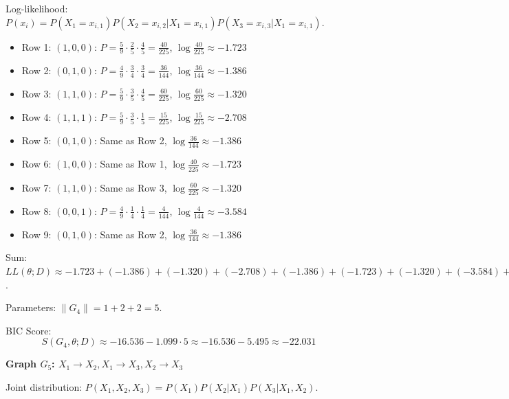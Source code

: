 \documentclass[a3paper,12pt]{extarticle} %
\begin{document}
Log-likelihood: \(P(x_i) = P(X_1 = x_{i,1}) P(X_2 = x_{i,2} | X_1 = x_{i,1}) P(X_3 = x_{i,3} | X_1 = x_{i,1})\).
\begin{itemize}
    \item Row 1: \((1,0,0)\): \(P = \frac{5}{9} \cdot \frac{2}{5} \cdot \frac{4}{5} = \frac{40}{225}\), \(\log \frac{40}{225} \approx -1.723\)
    \item Row 2: \((0,1,0)\): \(P = \frac{4}{9} \cdot \frac{3}{4} \cdot \frac{3}{4} = \frac{36}{144}\), \(\log \frac{36}{144} \approx -1.386\)
    \item Row 3: \((1,1,0)\): \(P = \frac{5}{9} \cdot \frac{3}{5} \cdot \frac{4}{5} = \frac{60}{225}\), \(\log \frac{60}{225} \approx -1.320\)
    \item Row 4: \((1,1,1)\): \(P = \frac{5}{9} \cdot \frac{3}{5} \cdot \frac{1}{5} = \frac{15}{225}\), \(\log \frac{15}{225} \approx -2.708\)
    \item Row 5: \((0,1,0)\): Same as Row 2, \(\log \frac{36}{144} \approx -1.386\)
    \item Row 6: \((1,0,0)\): Same as Row 1, \(\log \frac{40}{225} \approx -1.723\)
    \item Row 7: \((1,1,0)\): Same as Row 3, \(\log \frac{60}{225} \approx -1.320\)
    \item Row 8: \((0,0,1)\): \(P = \frac{4}{9} \cdot \frac{1}{4} \cdot \frac{1}{4} = \frac{4}{144}\), \(\log \frac{4}{144} \approx -3.584\)
    \item Row 9: \((0,1,0)\): Same as Row 2, \(\log \frac{36}{144} \approx -1.386\)
\end{itemize}
Sum: \(LL(\theta; D) \approx -1.723 + (-1.386) + (-1.320) + (-2.708) + (-1.386) + (-1.723) + (-1.320) + (-3.584) + (-1.386) \approx -16.536\).

Parameters: \(\|G_4\| = 1 + 2 + 2 = 5\).

BIC Score:
\[
S(G_4, \theta; D) \approx -16.536 - 1.099 \cdot 5 \approx -16.536 - 5.495 \approx -22.031
\]

\textbf{Graph \(G_5\): \(X_1 \to X_2, X_1 \to X_3, X_2 \to X_3\)}

Joint distribution: \(P(X_1, X_2, X_3) = P(X_1)P(X_2 | X_1)P(X_3 | X_1, X_2)\).
\end{document}
